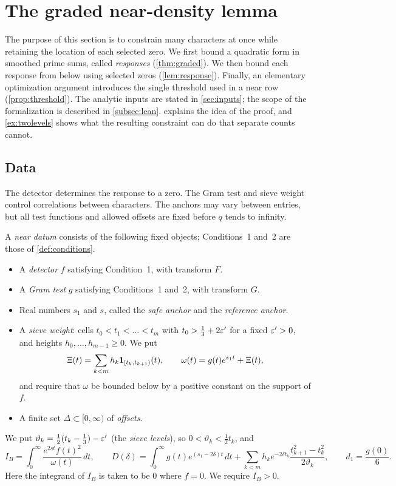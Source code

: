 \section{The graded near-density lemma}\label{sec:near}

The purpose of this section is to constrain many characters at once while retaining
the location of each selected zero. We first bound a quadratic form in smoothed prime
sums, called \emph{responses} (\cref{thm:graded}). We then bound each response from below
using selected zeros (\cref{lem:response}). Finally, an elementary optimization argument
introduces the single threshold used in a near row (\cref{prop:threshold}).
The analytic inputs are stated in \cref{sec:inputs}; the scope of the formalization is described
in \cref{subsec:lean}.  explains the idea of the proof, and
\cref{ex:twolevels} shows what the resulting constraint can do that separate counts cannot.

\subsection{Data}\label{subsec:neardata}
The detector determines the response to a zero. The Gram test and sieve weight control
correlations between characters. The anchors may vary between entries, but all test
functions and allowed offsets are fixed before $q$ tends to infinity.

\begin{definition}\label{def:neardatum}
A \emph{near datum} consists of the following fixed objects; Conditions~1 and~2 are
those of \cref{def:conditions}.
\begin{itemize}
  \item A \emph{detector} $f$ satisfying Condition~1, with transform $F$.
  \item A \emph{Gram test} $g$ satisfying Conditions~1 and~2, with transform $G$.
  \item Real numbers $s_1$ and $s$, called the \emph{safe anchor} and the
    \emph{reference anchor}.
  \item A \emph{sieve weight}: cells $t_0<t_1<\dots<t_m$ with $t_0>\frac13+2\varepsilon'$ for a fixed
    $\varepsilon'>0$, and heights $h_0,\dots,h_{m-1}\ge0$. We put
    \[
      \Xi(t)=\sum_{k<m}h_k\mathbf{1}_{[t_k,t_{k+1})}(t),\qquad
      \omega(t)=g(t)e^{s_1t}+\Xi(t),
    \]
    and require that $\omega$ be bounded below by a positive constant on the support of $f$.
  \item A finite set $\Delta\subset[0,\infty)$ of \emph{offsets}.
\end{itemize}
We put $\vartheta_k=\frac12(t_k-\frac13)-\varepsilon'$ (the \emph{sieve levels}), so $0<\vartheta_k<\frac12t_k$, and
\[
  I_B=\int_0^\infty\frac{e^{2st}f(t)^2}{\omega(t)}\,dt,\qquad
  D(\delta)=\int_0^\infty g(t)e^{(s_1-2\delta)t}\,dt+\sum_{k<m}h_ke^{-2\delta t_k}
    \frac{t_{k+1}^2-t_k^2}{2\vartheta_k},\qquad d_1=\frac{g(0)}6 .
\]
Here the integrand of $I_B$ is taken to be $0$ where $f=0$. We require $I_B>0$.
\end{definition}

